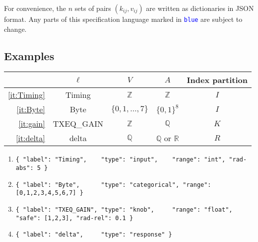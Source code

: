 \documentclass[a4paper,parskip=half]{scrartcl}
\newcommand*\spec[1]{\textcolor{blue}{\texttt{#1}}}
\begin{document}
For convenience, the $n$ sets of pairs $(k_{ij},v_{ij})$ are written as
dictionaries in JSON format.
Any parts of this specification language marked in \spec{blue} are subject to change.

\subsection{Examples}
\begin{center}
\begin{tabular}{rcccc}
	& $\ell$ & $V$ & $A$ & Index partition \\ \hline
	\ref{it:Timing} & Timing & $\mathbb Z$ & $\mathbb Z$ & $I$ \\
	\ref{it:Byte} & Byte & $\{0,1,\ldots,7\}$ & $\{0,1\}^8$ & $I$ \\
	\ref{it:gain} & TXEQ\_GAIN & $\mathbb Z$ & $\mathbb Q$ & $K$ \\
	\ref{it:delta} & delta & $\mathbb Q$ & $\mathbb Q$ or $\mathbb R$ & $R$
\end{tabular}
\end{center}
\begin{enumerate}
\item\label{it:Timing}
	{\footnotesize\verb!{ "label": "Timing",    "type": "input",    "range": "int", "rad-abs": 5 }!}
\item\label{it:Byte}
	{\footnotesize\verb!{ "label": "Byte",      "type": "categorical", "range": [0,1,2,3,4,5,6,7] }!}
\item\label{it:gain}
	{\footnotesize\verb!{ "label": "TXEQ_GAIN", "type": "knob",     "range": "float", "safe": [1,2,3], "rad-rel": 0.1 }!}
\item\label{it:delta}
	{\footnotesize\verb!{ "label": "delta",     "type": "response" }!}
\end{enumerate}
\end{document}
